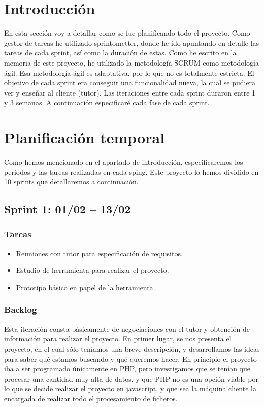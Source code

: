 
\section{Introducción}
En esta sección voy a detallar como se fue planificando todo el proyecto. Como gestor de tareas he utilizado sprintometter, donde he ido apuntando en detalle las tareas de cada sprint, así como la duración de estas.
Como he escrito en la memoria de este proyecto, he utilizado la metodología SCRUM \cite{SCRUM} como metodología ágil. Esa metodología ágil es adaptativa, por lo que no es totalmente estricta. El objetivo de cada sprint era conseguir una funcionalidad nueva, la cual se pudiera ver y enseñar al cliente (tutor). Las iteraciones entre cada sprint duraron entre 1 y 3 semanas. A continuación especificaré cada fase de cada sprint.

\section{Planificación temporal}
Como hemos mencionado en el apartado de introducción, especificaremos los periodos y las tareas realizadas en cada sping. Este proyecto lo hemos dividido en 10 sprints que detallaremos a continuación.

\subsection{Sprint 1: 01/02 – 13/02}
\subsubsection{Tareas}
\begin{itemize}
	\item Reuniones con tutor para especificación de requisitos.

	\item Estudio de herramienta para realizar el proyecto.

	\item Prototipo básico en papel de la herramienta.

\end{itemize}
\subsubsection{Backlog}
Esta iteración consta básicamente de negociaciones con el tutor y obtención de información para realizar el proyecto.
En primer lugar, se nos presenta el proyecto, en el cual sólo teníamos una breve descripción, y desarrollamos las ideas para saber qué estamos buscando y qué queremos hacer.
En principio el proyecto iba a ser programado únicamente en PHP, pero investigamos que se tenían que procesar una cantidad muy alta de datos, y que PHP no es una opción viable por lo que se decide realizar el proyecto en javascript, y que sea la máquina cliente la encargada de realizar todo el procesamiento de ficheros.

